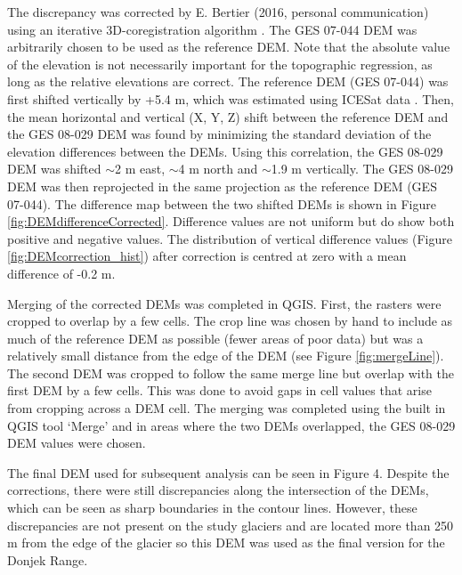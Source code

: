 \documentclass{sfuthesis}
\begin{document}
The discrepancy was corrected by E. Bertier (2016, personal communication) using an iterative 3D-coregistration algorithm \citep{Berthier2007}. The GES 07-044 DEM was arbitrarily chosen to be used as the reference DEM. Note that the absolute value of the elevation is not necessarily important for the topographic regression, as long as the relative elevations are correct. The reference DEM (GES 07-044) was first shifted vertically by +5.4 m, which was estimated using ICESat data \citep{Berthier2010}. Then, the mean horizontal and vertical (X, Y, Z) shift between the reference DEM and the GES 08-029 DEM was found by minimizing the standard deviation of the elevation differences between the DEMs. Using this correlation, the GES 08-029 DEM  was shifted $\sim$2 m east, $\sim$4 m north and $\sim$1.9 m vertically. The GES 08-029 DEM was then reprojected in the same projection as the reference DEM (GES 07-044). The difference map between the two shifted DEMs is shown in Figure \ref{fig:DEMdifferenceCorrected}. Difference values are not uniform but do show both positive and negative values. The distribution of vertical difference values (Figure \ref{fig:DEMcorrection_hist}) after correction is centred at zero with a mean difference of -0.2 m.

Merging of the corrected DEMs was completed in QGIS. First, the rasters were cropped to overlap by a few cells. The crop line was chosen by hand to include as much of the reference DEM as possible (fewer areas of poor data) but was a relatively small distance from the edge of the DEM (see Figure \ref{fig:mergeLine}). The second DEM was cropped to follow the same merge line but overlap with the first DEM by a few cells. This was done to avoid gaps in cell values that arise from cropping across a DEM cell. The merging was completed using the built in QGIS tool `Merge' and in areas where the two DEMs overlapped, the GES 08-029 DEM values were chosen.

The final DEM used for subsequent analysis can be seen in Figure 4. Despite the corrections, there were still discrepancies along the intersection of the DEMs, which can be seen as sharp boundaries in the contour lines. However, these discrepancies are not present on the study glaciers and are located more than 250 m from the edge of the glacier so this DEM was used as the final version for the Donjek Range.

\begin{figure}[H]
  \label{fig:finalDEM}
\end{figure}
\end{document}
